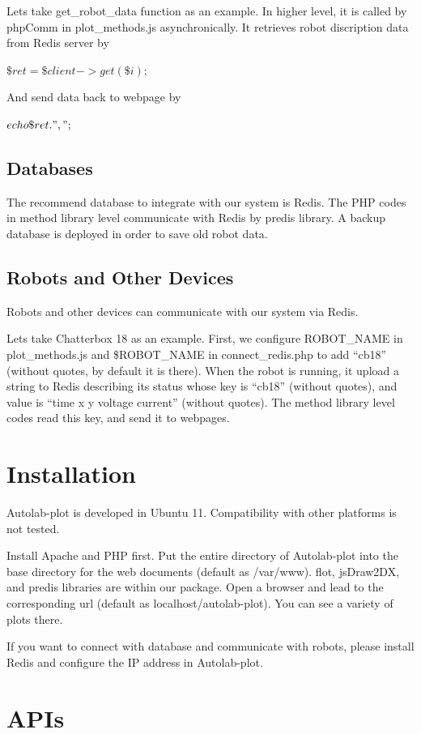 \documentclass{article}
\begin{document}
Lets take get\_robot\_data function as an example.
In higher level, it is called by phpComm in plot\_methods.js asynchronically.
It retrieves robot discription data from Redis server by

$\$ret = \$client->get(\$i);$

And send data back to webpage by

$echo \$ret.", ";$

\subsection{Databases}
The recommend database to integrate with our system is Redis.
The PHP codes in method library level communicate with Redis by predis library.
A backup database is deployed in order to save old robot data.

\subsection{Robots and Other Devices}
Robots and other devices can communicate with our system via Redis.

Lets take Chatterbox 18 as an example.
First, we configure ROBOT\_NAME in plot\_methods.js and \$ROBOT\_NAME in connect\_redis.php to add ``cb18'' (without quotes, by default it is there).
When the robot is running, it upload a string to Redis describing its status whose key is ``cb18'' (without quotes), and value is ``time x y voltage current'' (without quotes).
The method library level codes read this key, and send it to webpages.

\section{Installation}
Autolab-plot is developed in Ubuntu 11.
Compatibility with other platforms is not tested.

Install Apache and PHP first.
Put the entire directory of Autolab-plot into the base directory for the web documents (default as /var/www).
flot, jsDraw2DX, and predis libraries are within our package.
Open a browser and lead to the corresponding url (default as localhost/autolab-plot).
You can see a variety of plots there.

If you want to connect with database and communicate with robots, please install Redis and configure the IP address in Autolab-plot.

\section{APIs}
\end{document}

